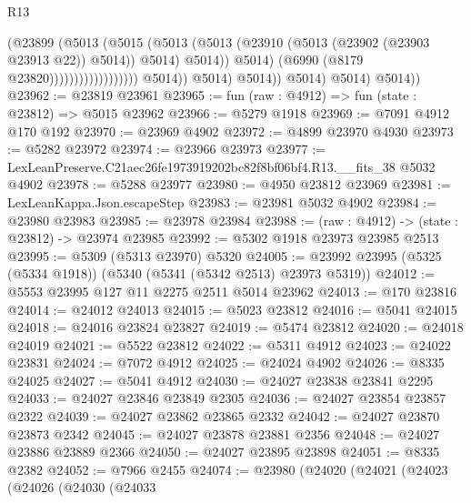 \begin{lexlean}{R13}
\begin{coremodule}
                                                    (@23899
                                                      (@5013
                                                        (@5015
                                                          (@5013
                                                            (@5013
                                                              (@23910
                                                                (@5013
                                                                  (@23902 (@23903 @23913 @22))
                                                                  @5014))
                                                              @5014)
                                                            @5014))
                                                        @5014)
                                                      (@6990 (@8179 @23820))))))))))))))))))
                      @5014))
                  @5014)
                @5014))
            @5014)
          @5014)
        @5014))
@23962 := @23819 @23961
@23965 := fun (raw : @4912) => fun (state : @23812) => @5015 @23962
@23966 := @5279 @1918
@23969 := @7091 @4912 @170 @192
@23970 := @23969 @4902
@23972 := @4899 @23970 @4930
@23973 := @5282 @23972
@23974 := @23966 @23973
@23977 := LexLeanPreserve.C21aec26fe1973919202bc82f8bf06bf4.R13.__fits_38 @5032 @4902
@23978 := @5288 @23977
@23980 := @4950 @23812 @23969
@23981 := LexLeanKappa.Json.escapeStep
@23983 := @23981 @5032 @4902
@23984 := @23980 @23983
@23985 := @23978 @23984
@23988 := (raw : @4912) -> (state : @23812) -> @23974 @23985
@23992 := @5302 @1918 @23973 @23985 @2513
@23995 := @5309 (@5313 @23970) @5320
@24005 := @23992 @23995 (@5325 (@5334 @1918)) (@5340 (@5341 (@5342 @2513) @23973 @5319))
@24012 := @5553 @23995 @127 @11 @2275 @2511 @5014 @23962
@24013 := @170 @23816
@24014 := @24012 @24013
@24015 := @5023 @23812
@24016 := @5041 @24015
@24018 := @24016 @23824 @23827
@24019 := @5474 @23812
@24020 := @24018 @24019
@24021 := @5522 @23812
@24022 := @5311 @4912
@24023 := @24022 @23831
@24024 := @7072 @4912
@24025 := @24024 @4902
@24026 := @8335 @24025
@24027 := @5041 @4912
@24030 := @24027 @23838 @23841 @2295
@24033 := @24027 @23846 @23849 @2305
@24036 := @24027 @23854 @23857 @2322
@24039 := @24027 @23862 @23865 @2332
@24042 := @24027 @23870 @23873 @2342
@24045 := @24027 @23878 @23881 @2356
@24048 := @24027 @23886 @23889 @2366
@24050 := @24027 @23895 @23898
@24051 := @8335 @2382
@24052 := @7966 @2455
@24074 := @23980
    (@24020
      (@24021
        (@24023
          (@24026
            (@24030
              (@24033

\end{coremodule}
\end{lexlean}
